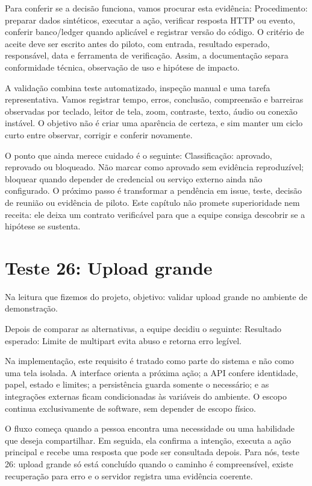 \documentclass[12pt,oneside,a4paper,article]{abntex2}
\begin{document}
Para conferir se a decisão funciona, vamos procurar esta evidência: Procedimento: preparar dados sintéticos, executar a ação, verificar resposta HTTP ou evento, conferir banco/ledger quando aplicável e registrar versão do código. O critério de aceite deve ser escrito antes do piloto, com entrada, resultado esperado, responsável, data e ferramenta de verificação. Assim, a documentação separa conformidade técnica, observação de uso e hipótese de impacto.

A validação combina teste automatizado, inspeção manual e uma tarefa representativa. Vamos registrar tempo, erros, conclusão, compreensão e barreiras observadas por teclado, leitor de tela, zoom, contraste, texto, áudio ou conexão instável. O objetivo não é criar uma aparência de certeza, e sim manter um ciclo curto entre observar, corrigir e conferir novamente.

O ponto que ainda merece cuidado é o seguinte: Classificação: aprovado, reprovado ou bloqueado. Não marcar como aprovado sem evidência reproduzível; bloquear quando depender de credencial ou serviço externo ainda não configurado. O próximo passo é transformar a pendência em issue, teste, decisão de reunião ou evidência de piloto. Este capítulo não promete superioridade nem receita: ele deixa um contrato verificável para que a equipe consiga descobrir se a hipótese se sustenta.

\section{Teste 26: Upload grande}
Na leitura que fizemos do projeto, objetivo: validar upload grande no ambiente de demonstração.

Depois de comparar as alternativas, a equipe decidiu o seguinte: Resultado esperado: Limite de multipart evita abuso e retorna erro legível.

Na implementação, este requisito é tratado como parte do sistema e não como uma tela isolada. A interface orienta a próxima ação; a API confere identidade, papel, estado e limites; a persistência guarda somente o necessário; e as integrações externas ficam condicionadas às variáveis do ambiente. O escopo continua exclusivamente de software, sem depender de escopo físico.

O fluxo começa quando a pessoa encontra uma necessidade ou uma habilidade que deseja compartilhar. Em seguida, ela confirma a intenção, executa a ação principal e recebe uma resposta que pode ser consultada depois. Para nós, teste 26: upload grande só está concluído quando o caminho é compreensível, existe recuperação para erro e o servidor registra uma evidência coerente.
\end{document}
